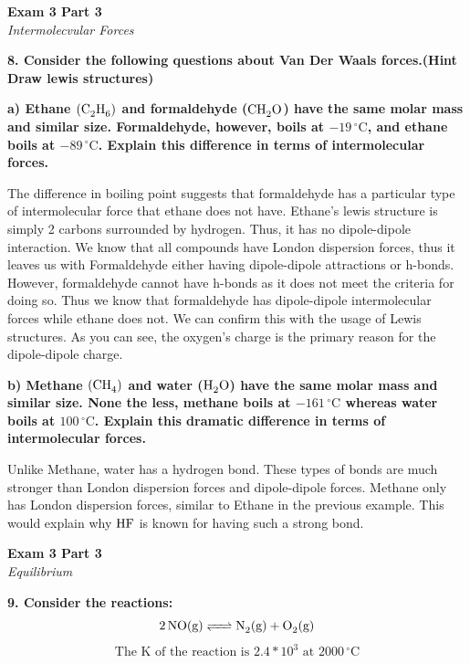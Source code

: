 \documentclass{article}
\begin{document}
    \pagebreak

    \begin{center}
        \textbf{Exam 3 Part 3}\\
        \textit{Intermolecvular Forces}
    \end{center}
    \textbf{8. Consider the following questions about Van Der Waals forces.(Hint Draw lewis structures)}

    \textbf{a) Ethane $(\ce{C2H6})$ and formaldehyde ($\ce{CH2O}$) have the same molar mass and similar size. Formaldehyde, however, boils at $-19\,^{\circ}\mathrm{C}$, and ethane boils at $-89\,^{\circ}\mathrm{C}$. Explain this difference in terms of intermolecular forces.}

    The difference in boiling point suggests that formaldehyde has a particular type of intermolecular force that ethane does not have. Ethane's lewis structure is simply 2 carbons surrounded by hydrogen. Thus, it has no dipole-dipole interaction. We know that all compounds have London dispersion forces, thus it leaves us with Formaldehyde either having dipole-dipole attractions or h-bonds. However, formaldehyde cannot have h-bonds as it does not meet the criteria for doing so. Thus we know that formaldehyde has dipole-dipole intermolecular forces while ethane does not.  We can confirm this with the usage of Lewis structures. As you can see, the oxygen's charge is the primary reason for the dipole-dipole charge.

    \textbf{b) Methane $(\ce{CH4})$ and water ($\ce{H2O}$) have the same molar mass and similar size. None the less, methane boils at $-161\,^{\circ}\mathrm{C}$  whereas water boils at $100\,^{\circ}\mathrm{C}$. Explain this  dramatic difference in terms of intermolecular forces.}

    Unlike Methane, water has a hydrogen bond. These types of bonds are much stronger than London dispersion forces and dipole-dipole forces. Methane only has London dispersion forces, similar to Ethane in the previous example. This would explain why $\ce{HF}$ is known for having such a strong bond.
    \pagebreak

    \begin{center}
        \textbf{Exam 3 Part 3}\\
        \textit{Equilibrium}
    \end{center}
    \textbf{9. Consider the reactions:}
    $$ \ce{2NO} (\si{\gram}) \ce{<=>} \ce{N2}(\si{\gram}) + \ce{O2}(\si{\gram})$$
    $$\text{The K of the reaction is } 2.4*10^{3} \text{ at }  2000\,^{\circ}\mathrm{C}$$
\end{document}
